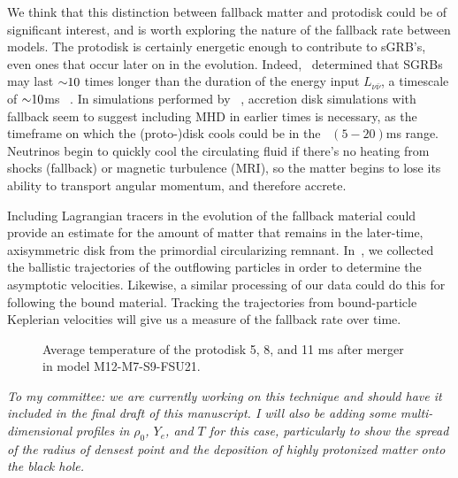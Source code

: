 We think that this distinction between fallback matter and protodisk could be of significant interest, and is worth exploring the nature of the fallback rate between models.
The protodisk is certainly energetic enough to contribute to sGRB's, even ones that occur later on in the evolution.
Indeed,~\cite{Aloy:2004nh} determined that SGRBs may last $\mathord{\sim}10$ times longer than the duration of the energy input $L_{\nu \bar{\nu}}$, a timescale of $\mathord{\sim} 10$ms ~\cite{shibata2006magnetized}.
In simulations performed by ~\cite{noori2016dissertation}, accretion disk simulations with fallback seem to suggest including MHD in earlier times is necessary, as the timeframe on which the (proto-)disk cools could be in the ~$(5-20)$ms range.
Neutrinos begin to quickly cool the circulating fluid if there's no heating from shocks (fallback) or magnetic turbulence (MRI), so the matter begins to lose its ability to transport angular momentum, and therefore accrete.

Including Lagrangian tracers in the evolution of the fallback material could provide an estimate for the amount of matter that remains in the later-time, axisymmetric disk from the primordial circularizing remnant.
In~\cite{FoucartDD2:2017}, we collected the ballistic trajectories of the outflowing particles in order to determine the asymptotic velocities.
Likewise, a similar processing of our data could do this for following the bound material.
Tracking the trajectories from bound-particle Keplerian velocities will give us a measure of the fallback rate over time.

\begin{figure}
	\centering
	
	\caption[Average temperature of the protodisks 5, 8, and 11 ms after merger]{
		Average temperature of the protodisk 5, 8, and 11 ms after merger in model M12-M7-S9-FSU21.
	}
	\label{fig:longdiskentropies}
\end{figure}

\textit{To my committee: we are currently working on this technique and should have it included in the final draft of this manuscript.  I will also be adding some multi-dimensional profiles in $\rho_0$, $Y_e$, and $T$ for this case, particularly to show the spread of the radius of densest point and the deposition of highly protonized matter onto the black hole.}


